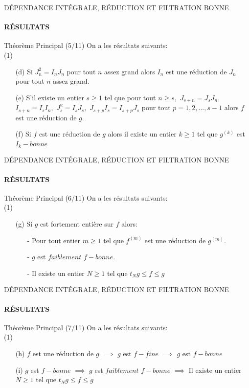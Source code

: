 \documentclass[11pt,a4paper]{beamer}
\begin{document}
\begin{frame}{DÉPENDANCE INTÉGRALE, RÉDUCTION ET FILTRATION BONNE}
	\framesubtitle{RÉSULTATS}
	\begin{block}{Théorème Principal (5/11)}
		On a les résultats suivants:\\
		(1)
		\begin{enumerate}
			\item[(d)]Si $J_{n}^{2}=I_{n}J_{n}$ pour tout $n$ assez grand alors $I_{n}$ est une réduction de $J_{n}$ pour tout $n$ assez grand. 
			\item[(e)]S'il existe un entier $s\geq 1$ tel que pour tout $n\geq s,$ $J_{s+n}=J_{s}J_{n},$ $I_{s+n}=I_{s}I_{n},$ $J_{s}^{2}=I_{s}J_{s},$ $J_{s+p}I_{s}=I_{s+p}J_{s}$ pour tout $p=1,2,...,s-1$ alors $f$ est une réduction de $g.$
			\item[(f)]Si $f$ est une réduction de $g$ alors il existe un entier $k\geq 1$ tel que $g^{(k)}$ est $I_{k}-bonne$
		\end{enumerate}
	\end{block}
\end{frame}

\begin{frame}{DÉPENDANCE INTÉGRALE, RÉDUCTION ET FILTRATION BONNE}
	\framesubtitle{RÉSULTATS}
	\begin{block}{Théorème Principal (6/11)}
		On a les résultats suivants:\\
		(1)
		\begin{enumerate}
			\item[(g)] Si $g$ est fortement entière sur $f$ alors:
			\begin{enumerate}
				\item[-] Pour tout entier $m\geq 1$ tel que $f^{(m)}$ est une réduction de $g^{(m)}.$
				\item[-] $g$ est $faiblement$ $f-bonne.$
				\item[-] Il existe un entier $N\geq 1$ tel que $t_{N}g\leq f\leq g$
			\end{enumerate}
		\end{enumerate}
	\end{block}
\end{frame}

\begin{frame}{DÉPENDANCE INTÉGRALE, RÉDUCTION ET FILTRATION BONNE}
	\framesubtitle{RÉSULTATS}
	\begin{block}{Théorème Principal (7/11)}
		On a les résultats suivants:\\
		(1)
		\begin{enumerate}
			\item[(h)] $f$ est une réduction de $g$ $\implies$ $g$ est $f-fine$ $\implies$ $g$ est $f-bonne$
			\item[(i)] $g$ est $f-bonne$ $\implies$  $g$ est $faiblement$ $f-bonne$ $\implies$ Il existe un entier $N\geq 1$ tel que $t_{N}g\leq f\leq g$
		\end{enumerate}
	\end{block}
\end{frame}
\end{document}
